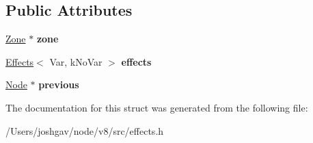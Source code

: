 \subsection*{Public Attributes}
\begin{DoxyCompactItemize}
\item 
\hyperlink{classv8_1_1internal_1_1_zone}{Zone} $\ast$ {\bfseries zone}\hypertarget{structv8_1_1internal_1_1_nested_effects_base_1_1_node_abd10de1c0eb79a7b7e2945d30a49bff2}{}\label{structv8_1_1internal_1_1_nested_effects_base_1_1_node_abd10de1c0eb79a7b7e2945d30a49bff2}

\item 
\hyperlink{classv8_1_1internal_1_1_effects}{Effects}$<$ Var, k\+No\+Var $>$ {\bfseries effects}\hypertarget{structv8_1_1internal_1_1_nested_effects_base_1_1_node_ae1785f66b58c1bb37e86459ece1d9815}{}\label{structv8_1_1internal_1_1_nested_effects_base_1_1_node_ae1785f66b58c1bb37e86459ece1d9815}

\item 
\hyperlink{structv8_1_1internal_1_1_nested_effects_base_1_1_node}{Node} $\ast$ {\bfseries previous}\hypertarget{structv8_1_1internal_1_1_nested_effects_base_1_1_node_ab5083043184cd5249d6aadbf55a7b759}{}\label{structv8_1_1internal_1_1_nested_effects_base_1_1_node_ab5083043184cd5249d6aadbf55a7b759}

\end{DoxyCompactItemize}


The documentation for this struct was generated from the following file\+:\begin{DoxyCompactItemize}
\item 
/\+Users/joshgav/node/v8/src/effects.\+h\end{DoxyCompactItemize}

